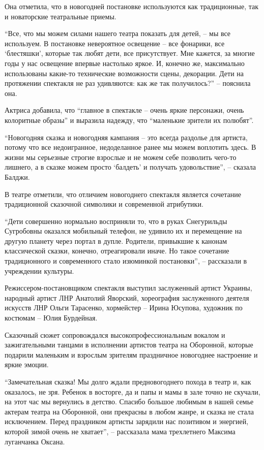 Она отметила, что в новогодней постановке используются как традиционные, так и
новаторские театральные приемы.

\enquote{Все, что мы можем силами нашего театра показать для детей, – мы все
используем. В постановке невероятное освещение – все фонарики, все \enquote{блестяшки},
которые так любят дети, все присутствует. Мне кажется, за многие годы у нас
освещение впервые настолько яркое. И, конечно же, максимально использованы
какие-то технические возможности сцены, декорации. Дети на протяжении спектакля
не раз удивляются: как же так получилось?} – пояснила она.


Актриса добавила, что \enquote{главное в спектакле – очень яркие персонажи, очень
колоритные образы} и выразила надежду, что \enquote{маленькие зрители их полюбят}.

\enquote{Новогодняя сказка и новогодняя кампания – это всегда раздолье для артиста,
потому что все недоигранное, недоделанное ранее мы можем воплотить здесь. В
жизни мы серьезные строгие взрослые и не можем себе позволить чего-то лишнего,
а в сказке можем просто \enquote{балдеть} и получать удовольствие}, – сказала Балджи.

В театре отметили, что отличием новогоднего спектакля является сочетание
традиционной сказочной символики и современной атрибутики.


\enquote{Дети совершенно нормально восприняли то, что в руках Снегурильды Сугробовны
оказался мобильный телефон, не удивило их и перемещение на другую планету через
портал в дупле. Родители, привыкшие к канонам классической сказки, конечно,
отреагировали иначе. Но такое сочетание традиционного и современного стало
изюминкой постановки}, – рассказали в учреждении культуры.

Режиссером-постановщиком спектакля выступил заслуженный артист Украины,
народный артист ЛНР Анатолий Яворский, хореография заслуженного деятеля
искусств ЛНР Ольги Тарасенко, хормейстер – Ирина Юсупова, художник по костюмам
– Юлия Бурдейная.

Сказочный сюжет сопровождался высокопрофессиональным вокалом и зажигательными
танцами в исполнении артистов театра на Оборонной, которые подарили маленьким и
взрослым зрителям праздничное новогоднее настроение и яркие эмоции.

\enquote{Замечательная сказка! Мы долго ждали предновогоднего похода в театр и, как
оказалось, не зря. Ребенок в восторге, да и папы и мамы в зале точно не
скучали, на этот час мы вернулись в детство. Спасибо большое любимым в нашей
семье актерам театра на Оборонной, они прекрасны в любом жанре, и сказка не
стала исключением. Перед праздником артисты зарядили нас позитивом и энергией,
которой зимой очень не хватает}, – рассказала мама трехлетнего Максима
луганчанка Оксана.

